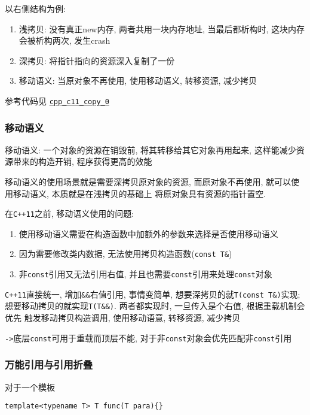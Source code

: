 以右侧结构为例: 



\begin{enumerate}
	\item 浅拷贝: 没有真正new内存, 两者共用一块内存地址, 当最后都析构时, 这块内存会被析构两次, 发生crash
	\item 深拷贝: 将指针指向的资源深入复制了一份
	\item 移动语义: 当原对象不再使用, 使用移动语义, 转移资源, 减少拷贝
\end{enumerate}
参考代码见 \href{https://github.com/wenqingqian/Obtuse/tree/main/test/cpp/c++11/copy_0}{\tt cpp\_c11\_copy\_0}
\subsubsection{移动语义}
移动语义: 一个对象的资源在销毁前, 将其转移给其它对象再用起来, 这样能减少资源带来的构造开销, 程序获得更高的效能

移动语义的使用场景就是需要深拷贝原对象的资源, 而原对象不再使用, 就可以使用移动语义, 本质就是在浅拷贝的基础上
	将原对象具有资源的指针置空.

在{\tt C++11}之前, 移动语义使用的问题:
\begin{enumerate}
	\item 使用移动语义需要在构造函数中加额外的参数来选择是否使用移动语义
	\item 因为需要修改类内数据, 无法使用拷贝构造函数({\tt const T\&})
	\item 非{\tt const}引用又无法引用右值, 并且也需要{\tt const}引用来处理{\tt const}对象
\end{enumerate}

{\tt C++11}直接统一, 增加{\tt \&\&}右值引用, 事情变简单, 想要深拷贝的就{\tt T(const T\&)}实现;
	想要移动拷贝的就实现{\tt T(T\&\&)}. 两者都实现时, 一旦传入是个右值, 根据重载机制会优先
	触发移动拷贝构造调用, 使用移动语意, 转移资源, 减少拷贝

{\tt ->}\quad 底层{\tt const}可用于重载而顶层不能, 对于非{\tt const}对象会优先匹配非{\tt const}引用
\subsubsection{万能引用与引用折叠}

对于一个模板
\begin{lstlisting}[xleftmargin=10em,xrightmargin=10em]
template<typename T> T func(T para){}
\end{lstlisting}

